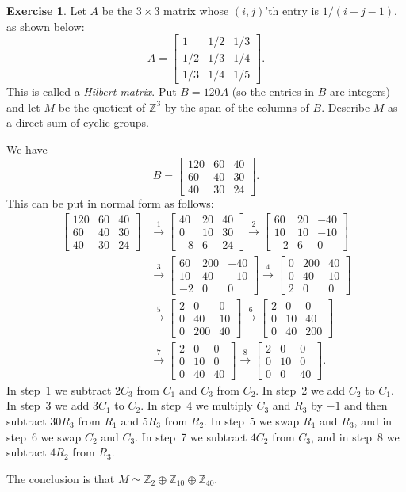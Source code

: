 \documentclass{amsart}
\newcommand{\bbm}       {\left[\begin{matrix}}
\newcommand{\ebm}       {\end{matrix}\right]}
\newcommand{\Z}         {{\mathbb{Z}}}
\newcommand{\tm}        {\times}
\newcommand{\xra}       {\xrightarrow}
\newcommand{\ip}[1]     {\langle #1\rangle}
\newcommand{\op}        {\oplus}
\renewcommand{\:}{\colon}
\theoremstyle{definition}
\newtheorem{exercise}{Exercise}[section]
\renewenvironment{solution}{\SolutionAtEnd}{\endSolutionAtEnd}
\begin{document}
\begin{exercise}
 Let $A$ be the $3\tm 3$ matrix whose $(i,j)$'th entry is $1/(i+j-1)$,
 as shown below:
 \[ A = \bbm 1 & 1/2 & 1/3 \\ 1/2 & 1/3 & 1/4 \\ 1/3 & 1/4 & 1/5\ebm.
 \]
 This is called a \emph{Hilbert matrix}.  Put $B=120 A$ (so the
 entries in $B$ are integers) and let $M$ be the quotient of $\Z^3$ by
 the span of the columns of $B$.  Describe $M$ as a direct sum of
 cyclic groups. 
\end{exercise}
\begin{solution}
 We have 
 \[ B = \bbm 120 & 60 & 40 \\ 60 & 40 & 30 \\ 40 & 30 & 24 \ebm. \]
 This can be put in normal form as follows:
 \begin{align*}
           \bbm 120 & 60 & 40 \\ 60 & 40 & 30 \\ 40 & 30 & 24 \ebm 
  &\xra{1} \bbm 40 & 20 & 40 \\ 0 & 10 & 30 \\ -8 & 6 & 24 \ebm 
   \xra{2} \bbm 60 & 20 & -40 \\ 10 & 10 & -10 \\ -2 & 6 & 0 \ebm \\
  &\xra{3} \bbm 60 & 200 & -40 \\ 10 & 40 & -10 \\ -2 & 0 & 0 \ebm
   \xra{4} \bbm 0 & 200 & 40 \\ 0 & 40 & 10 \\ 2 & 0 & 0 \ebm \\
  &\xra{5} \bbm 2 & 0 & 0 \\ 0 & 40 & 10 \\ 0 & 200 & 40 \ebm 
   \xra{6} \bbm 2 & 0 & 0 \\ 0 & 10 & 40 \\ 0 & 40 & 200 \ebm  \\
  &\xra{7} \bbm 2 & 0 & 0 \\ 0 & 10 & 0 \\ 0 & 40 & 40 \ebm 
   \xra{8} \bbm 2 & 0 & 0 \\ 0 & 10 & 0 \\ 0 & 0 & 40 \ebm.
 \end{align*}
 In step~1 we subtract $2C_3$ from $C_1$ and $C_3$ from $C_2$.  In
 step~2 we add $C_2$ to $C_1$.  In step~3 we add $3C_1$ to $C_2$.  In
 step~4 we multiply $C_3$ and $R_3$ by $-1$ and then subtract $30R_3$
 from $R_1$ and $5R_3$ from $R_2$.  In step~5 we swap $R_1$ and $R_3$,
 and in step~6 we swap $C_2$ and $C_3$.  In step~7 we subtract $4C_2$
 from $C_3$, and in step~8 we subtract $4R_2$ from $R_3$.

 The conclusion is that $M\simeq\Z_{2}\op\Z_{10}\op\Z_{40}$.
\end{solution}
\end{document}
